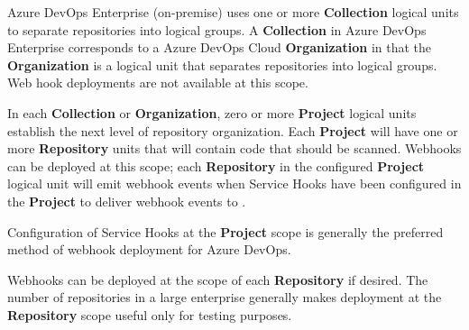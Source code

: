 Azure DevOps Enterprise (on-premise) uses one or more \textbf{Collection} logical units to separate
repositories into logical groups.  A \textbf{Collection} in Azure DevOps Enterprise 
corresponds to a Azure DevOps Cloud \textbf{Organization} in that the \textbf{Organization} is a logical unit 
that separates repositories into logical groups. Web hook deployments are not available at this scope.

In each \textbf{Collection} or \textbf{Organization}, zero or more \textbf{Project} logical
units establish the next level of repository organization.  Each \textbf{Project} will 
have one or more \textbf{Repository} units that will contain code that should be scanned.  Webhooks
can be deployed at this scope; each \textbf{Repository} in the configured \textbf{Project} logical unit
will emit webhook events when Service Hooks have been configured in the \textbf{Project} to
deliver webhook events to \cxoneflow.

Configuration of Service Hooks at the \textbf{Project} scope is generally the preferred
method of webhook deployment for Azure DevOps.

Webhooks can be deployed at the scope of each \textbf{Repository} if desired.  The number of repositories
in a large enterprise generally makes deployment at the \textbf{Repository} scope useful
only for testing purposes.
